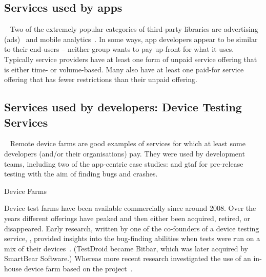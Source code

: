 \subsection{Services used by apps}~\label{rw-services-used-by-apps-topic}
Two of the extremely popular categories of third-party libraries are advertising (ads)~ and mobile analytics~.
In some ways, app developers appear to be similar to their end-users -- neither group wants to pay up-front for what it uses.%
 Typically service providers have at least one form of unpaid service offering that is either time- or volume-based. Many also have at least one paid-for service offering that has fewer restrictions than their unpaid offering.


\subsection{Services used by developers: Device Testing Services}~\label{rw-services-used-by-devs-device-testing-services}
Remote device farms are good examples of services for which at least some developers (and/or their organisations) pay. They were used by development teams, including two of the app-centric case studies:  and \Gls{gtaf} for pre-release testing with the aim of finding bugs and crashes.

\begin{remark}{Device Farms} 

Device test farms have been available commercially since around 2008. 
Over the years different offerings have peaked and then either been acquired, retired, or disappeared.
Early research, written by one of the co-founders of a device testing service, , %
 provided insights into the bug-finding abilities when tests were run on a mix of their devices~. (TestDroid became Bitbar, which was later acquired by SmartBear Software.) 
Whereas more recent research investigated the use of an in-house device farm based on the  project~.
\end{remark}

